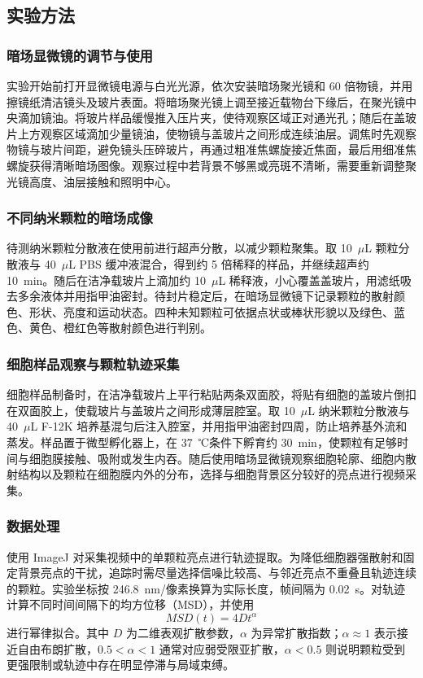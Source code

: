 \documentclass[a4paper]{article}
\begin{document}
\subsection{实验方法}

\subsubsection{暗场显微镜的调节与使用}

实验开始前打开显微镜电源与白光光源，依次安装暗场聚光镜和 60 倍物镜，并用擦镜纸清洁镜头及玻片表面。将暗场聚光镜上调至接近载物台下缘后，在聚光镜中央滴加镜油。将玻片样品缓慢推入压片夹，使待观察区域正对通光孔；随后在盖玻片上方观察区域滴加少量镜油，使物镜与盖玻片之间形成连续油层。调焦时先观察物镜与玻片间距，避免镜头压碎玻片，再通过粗准焦螺旋接近焦面，最后用细准焦螺旋获得清晰暗场图像。观察过程中若背景不够黑或亮斑不清晰，需要重新调整聚光镜高度、油层接触和照明中心。

\subsubsection{不同纳米颗粒的暗场成像}

待测纳米颗粒分散液在使用前进行超声分散，以减少颗粒聚集。取 10~$\mu$L 颗粒分散液与 40~$\mu$L PBS 缓冲液混合，得到约 5 倍稀释的样品，并继续超声约 10~min。随后在洁净载玻片上滴加约 10~$\mu$L 稀释液，小心覆盖盖玻片，用滤纸吸去多余液体并用指甲油密封。待封片稳定后，在暗场显微镜下记录颗粒的散射颜色、形状、亮度和运动状态。四种未知颗粒可依据点状或棒状形貌以及绿色、蓝色、黄色、橙红色等散射颜色进行判别。

\subsubsection{细胞样品观察与颗粒轨迹采集}

细胞样品制备时，在洁净载玻片上平行粘贴两条双面胶，将贴有细胞的盖玻片倒扣在双面胶上，使载玻片与盖玻片之间形成薄层腔室。取 10~$\mu$L 纳米颗粒分散液与 40~$\mu$L F-12K 培养基混匀后注入腔室，并用指甲油密封四周，防止培养基外流和蒸发。样品置于微型孵化器上，在 37~℃条件下孵育约 30~min，使颗粒有足够时间与细胞膜接触、吸附或发生内吞。随后使用暗场显微镜观察细胞轮廓、细胞内散射结构以及颗粒在细胞膜内外的分布，选择与细胞背景区分较好的亮点进行视频采集。

\subsubsection{数据处理}

使用 ImageJ 对采集视频中的单颗粒亮点进行轨迹提取。为降低细胞器强散射和固定背景亮点的干扰，追踪时需尽量选择信噪比较高、与邻近亮点不重叠且轨迹连续的颗粒。实验坐标按 246.8~nm/像素换算为实际长度，帧间隔为 0.02~s。对轨迹计算不同时间间隔下的均方位移（MSD），并使用
\[
  MSD(t)=4Dt^{\alpha}
\]
进行幂律拟合。其中 $D$ 为二维表观扩散参数，$\alpha$ 为异常扩散指数；$\alpha\approx1$ 表示接近自由布朗扩散，$0.5<\alpha<1$ 通常对应弱受限亚扩散，$\alpha<0.5$ 则说明颗粒受到更强限制或轨迹中存在明显停滞与局域束缚。
\end{document}
